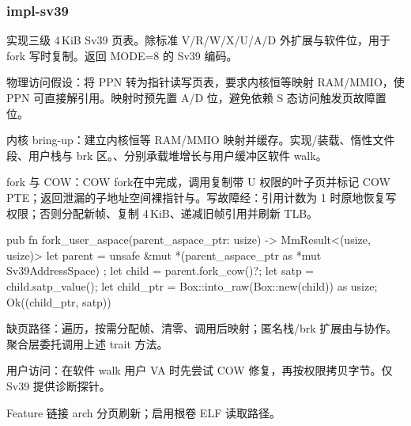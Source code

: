 
\subsubsection{impl-sv39}

实现三级 4\,KiB Sv39 页表。除标准 V/R/W/X/U/A/D 外扩展与软件位，用于 fork 写时复制。返回 MODE=8 的 Sv39 编码。

物理访问假设：将 PPN 转为指针读写页表，要求内核恒等映射 RAM/MMIO，使 PPN 可直接解引用。映射时预先置 A/D 位，避免依赖 S 态访问触发页故障置位。

内核 bring-up：建立内核恒等 RAM/MMIO 映射并缓存。实现/装载、惰性文件段、用户栈与 brk 区。、分别承载堆增长与用户缓冲区软件 walk。

fork 与 COW：COW fork在中完成，调用复制带 U 权限的叶子页并标记 COW PTE；返回泄漏的子地址空间裸指针与。写故障经：引用计数为 1 时原地恢复写权限；否则分配新帧、复制 4\,KiB、递减旧帧引用并刷新 TLB。

\begin{rustcode}
pub fn fork_user_aspace(parent_aspace_ptr: usize) -> MmResult<(usize, usize)> {
    let parent = unsafe { &mut *(parent_aspace_ptr as *mut Sv39AddressSpace) };
    let child = parent.fork_cow()?;
    let satp = child.satp_value();
    let child_ptr = Box::into_raw(Box::new(child)) as usize;
    Ok((child_ptr, satp))
}
\end{rustcode}

缺页路径：遍历，按需分配帧、清零、调用后映射；匿名栈/brk 扩展由与协作。聚合层委托调用上述 trait 方法。

用户访问：在软件 walk 用户 VA 时先尝试 COW 修复，再按权限拷贝字节。仅 Sv39 提供诊断探针。

Feature 链接 arch 分页刷新；启用根卷 ELF 读取路径。
